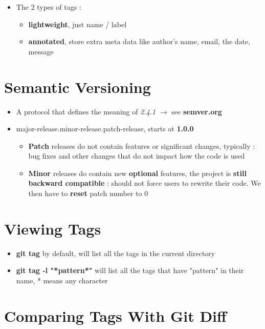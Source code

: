 \documentclass{report}
\begin{document}
\begin{itemize}
	\item The 2 types of tags :
		\begin{itemize}
			\item \textbf{lightweight}, just name / label 
			\item \textbf{annotated}, store extra meta data like author's name, email, the date, message
		\end{itemize}
\end{itemize}

\section{Semantic Versioning}

\begin{itemize}
	\item A protocol that defines the meaning of \textit{2.4.1} $\rightarrow$ see \textbf{semver.org} 
	\item major-release.minor-release.patch-release, starts at \textbf{1.0.0} 
		\begin{itemize}
			\item \textbf{Patch} releases do not contain features or significant changes, typically : bug fixes and other changes that do not impact how the code is used 
			\item \textbf{Minor} releases do contain new \textbf{optional} features, the project is \textbf{still backward compatible} : should not force users to rewrite their code. We then have to \textbf{reset} patch number to 0
		\end{itemize}
\end{itemize}

\section{Viewing Tags}

\begin{itemize}
	\item \textbf{git tag} by default, will list all the tags in the current directory 
	\item \textbf{git tag -l "*pattern*"} will list all the tags that have "pattern" in their name, * means any character
\end{itemize}

\section{Comparing Tags With Git Diff}
\end{document}
